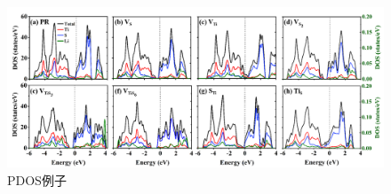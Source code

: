\begin{figure}
    \centering
    \includegraphics[width=1\linewidth]{VASP计算/态密度计算/态密度基础/fig/PDOS例子}
    \caption{PDOS例子}
    \label{fig:态密度基础-PDOS例子}
\end{figure}








